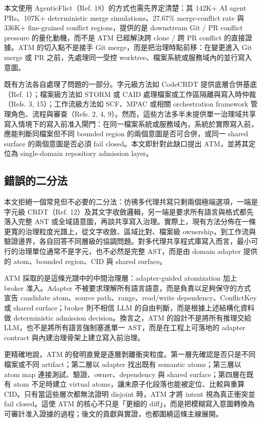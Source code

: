 \documentclass[a4paper,fontset=none]{ctexart}
\begin{document}
本文使用 AgenticFlict（Ref. 18）的方式也需先界定清楚：其 142K+ AI agent PRs、107K+ deterministic merge simulations、27.67\% merge-conflict rate 與 336K+ fine-grained conflict regions，提供的是 downstream Git / PR conflict pressure 的量化動機，而不是 ATM 已經解決跨 clone / 跨 PR conflict 的直接證據。ATM 的切入點不是接手 Git merge，而是把治理時點前移：在變更進入 Git merge 或 PR 之前，先處理同一受控 worktree、檔案系統或服務域內的並行寫入意圖。

既有方法各自處理了問題的一部分。字元級方法如 CodeCRDT 提供底層合併基底（Ref. 1）；檔案級方法如 STORM 或 CAID 處理檔案或工作區隔離與寫入時仲裁（Refs. 3, 15）；工作流級方法如 SCF、MPAC 或相關 orchestration framework 管理角色、流程與審查（Refs. 2, 4, 9）。然而，這些方法多半未提供單一治理域共享寫入情境下的寫入前准入閘門：在同一檔案系統或服務域內，系統於實際寫入前，應能判斷同檔案但不同 bounded region 的兩個意圖是否可合併，或同一 shared surface 的兩個意圖是否必須 fail closed。本文即針對此缺口提出 ATM，並將其定位為 single-domain repository admission layer。

\subsection{錯誤的二分法}

本文拒絕一個常見但不必要的二分法：彷彿多代理共寫只剩兩個極端選項，一端是字元級 CRDT（Ref. 12）及其文字收斂邏輯，另一端是要求所有語言與格式都先落入完整 AST 或全域語意圖，再談共享寫入治理。實際上，現有方法分佈在一條更寬的治理粒度光譜上，從文字收斂、區域比對、檔案級 ownership，到工作流與驗證邊界，各自回答不同層級的協調問題。對多代理共享程式庫寫入而言，最小可行的治理單位通常不是字元，也不必然是完整 AST，而是由 domain adapter 提供的 atom、bounded region、CID 與 shared surface。

ATM 採取的是這條光譜中的中間治理層：adapter-guided atomization 加上 broker 准入。Adapter 不被要求理解所有語言語意，而是負責以足夠保守的方式宣告 candidate atom、source path、range、read/write dependency、ConflictKey 或 shared surface；broker 則不相信 LLM 的自由判斷，而是根據上述結構化資料做 deterministic admission decision。換言之，ATM 的設計不是將所有推理交給 LLM，也不是將所有語言強制塞進單一 AST，而是在工程上可落地的 adapter contract 與內建治理骨架上建立寫入前治理。

更精確地說，ATM 的發明直覺是逐層剝離衝突粒度。第一層先確認是否只是不同檔案或不同 artifact；第二層以 adapter 找出既有 semantic atoms；第三層以 atom map 連接測試、驗證、owner、dependency 與 shared surface；第四層在既有 atom 不足時建立 virtual atoms，讓未原子化段落也能被定位、比較與重算 CID。只有當這些層次都無法證明 disjoint 時，ATM 才將 intent 視為真正衝突並 fail closed。這使 ATM 的核心不只是「更細的 diff」，而是把模糊寫入意圖轉換為可審計准入證據的過程；後文的貢獻與實證，也都圍繞這條主線展開。
\end{document}
